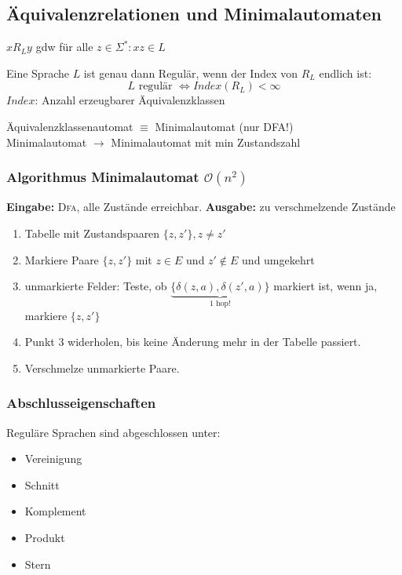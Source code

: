 \documentclass{scrartcl}
\begin{document}
\subsection*{Äquivalenzrelationen und Minimalautomaten}
$xR_Ly$ gdw für alle $z\in\Sigma^*: xz\in L$
\begin{shaded}
    Eine Sprache $L$ ist genau dann Regulär, wenn der Index von $R_L$ endlich ist:
    \[L \textrm{ regulär } \Leftrightarrow Index(R_L) < \infty \]
    {\tiny $Index$: Anzahl erzeugbarer Äquivalenzklassen}
\end{shaded}

Äquivalenzklassenautomat $\equiv$ Minimalautomat (nur DFA!) \\
Minimalautomat $\to$ Minimalautomat mit min Zustandszahl

\subsubsection*{Algorithmus Minimalautomat $\mathcal{O}(n^2)$}
\textbf{Eingabe:} \textsc{Dfa}, alle Zustände erreichbar.
\textbf{Ausgabe:} zu verschmelzende Zustände
\begin{enumerate}
    \item Tabelle mit Zustandspaaren $\{z,z'\}, z\not= z'$
    \item Markiere Paare $\{z,z'\}$ mit $z\in E$ und $z'\not\in E$ und umgekehrt
    \item unmarkierte Felder: Teste, ob $\underset{1\textrm{ hop!}}{\underbrace{\{\delta(z,a),\delta(z',a)\}}}$ markiert ist, wenn ja, markiere $\{z,z'\}$
    \item Punkt $3$ widerholen, bis keine Änderung mehr in der Tabelle passiert.
    \item Verschmelze unmarkierte Paare.
\end{enumerate}

\subsubsection*{Abschlusseigenschaften}
\begin{shaded}
    Reguläre Sprachen sind abgeschlossen unter:
    \begin{itemize}
        \item Vereinigung
        \item Schnitt
        \item Komplement
        \item Produkt
        \item Stern
    \end{itemize}
\end{shaded}
\end{document}

